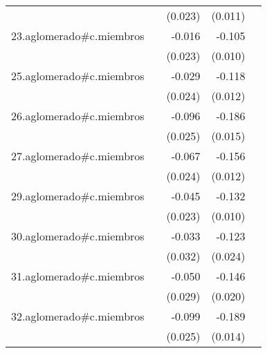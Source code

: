 {\begin{longtable}{l*{4}{D{.}{.}{-1}}}
            &                     &     (0.023)         &     (0.011)         &                     \\
\addlinespace
23.aglomerado#c.miembros&                     &      -0.016         &      -0.105\sym{***}&                     \\
            &                     &     (0.023)         &     (0.010)         &                     \\
\addlinespace
25.aglomerado#c.miembros&                     &      -0.029         &      -0.118\sym{***}&                     \\
            &                     &     (0.024)         &     (0.012)         &                     \\
\addlinespace
26.aglomerado#c.miembros&                     &      -0.096\sym{***}&      -0.186\sym{***}&                     \\
            &                     &     (0.025)         &     (0.015)         &                     \\
\addlinespace
27.aglomerado#c.miembros&                     &      -0.067\sym{**} &      -0.156\sym{***}&                     \\
            &                     &     (0.024)         &     (0.012)         &                     \\
\addlinespace
29.aglomerado#c.miembros&                     &      -0.045\sym{*}  &      -0.132\sym{***}&                     \\
            &                     &     (0.023)         &     (0.010)         &                     \\
\addlinespace
30.aglomerado#c.miembros&                     &      -0.033         &      -0.123\sym{***}&                     \\
            &                     &     (0.032)         &     (0.024)         &                     \\
\addlinespace
31.aglomerado#c.miembros&                     &      -0.050         &      -0.146\sym{***}&                     \\
            &                     &     (0.029)         &     (0.020)         &                     \\
\addlinespace
32.aglomerado#c.miembros&                     &      -0.099\sym{***}&      -0.189\sym{***}&                     \\
            &                     &     (0.025)         &     (0.014)         &                     \\

\end{longtable}}
